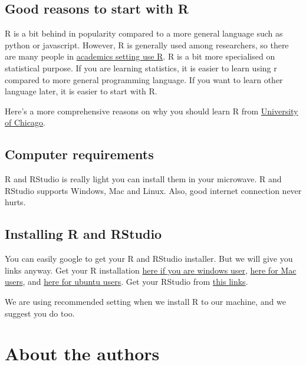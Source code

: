 \documentclass[
]{book}
\begin{document}
\hypertarget{good-reasons-to-start-with-r}{%
\subsection{Good reasons to start with R}\label{good-reasons-to-start-with-r}}

R is a bit behind in popularity compared to a more general language such as python or javascript. However, R is generally used among researchers, so there are many people in \href{https://campus.sagepub.com/blog/where-should-i-start-r-or-python}{academics setting use R}. R is a bit more specialised on statistical purpose. If you are learning statistics, it is easier to learn using r compared to more general programming language. If you want to learn other language later, it is easier to start with R.

Here's a more comprehensive reasons on why you should learn R from \href{https://cfss.uchicago.edu/setup/what-is-r/}{University of Chicago}.

\hypertarget{computer-requirements}{%
\subsection{Computer requirements}\label{computer-requirements}}

R and RStudio is really light you can install them in your microwave. R and RStudio supports Windows, Mac and Linux. Also, good internet connection never hurts.

\hypertarget{installing-r-and-rstudio}{%
\subsection{Installing R and RStudio}\label{installing-r-and-rstudio}}

You can easily google to get your R and RStudio installer. But we will give you links anyway. Get your R installation \href{https://cran.r-project.org/bin/windows/base/}{here if you are windows user}, \href{https://cran.r-project.org/bin/macosx/}{here for Mac users}, and \href{https://www.digitalocean.com/community/tutorials/how-to-install-r-on-ubuntu-18-04-quickstart}{here for ubuntu users}. Get your RStudio from \href{https://rstudio.com/products/rstudio/download/\#download}{this links}.

We are using recommended setting when we install R to our machine, and we suggest you do too.

\hypertarget{about-the-authors}{%
\section{About the authors}\label{about-the-authors}}
\end{document}

